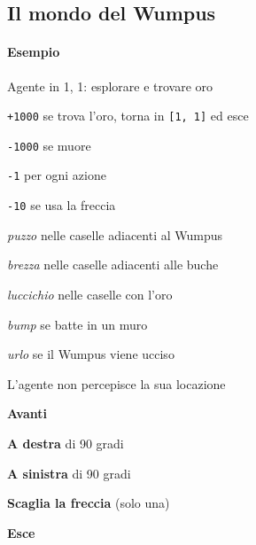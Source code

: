 \documentclass[10pt]{book}
\begin{document}
\subsection{Il mondo del Wumpus}
\paragraph{Esempio} Agente in 1, 1: esplorare e trovare oro
\begin{multicols}{2}
\begin{list}{}{\textbf{Misura delle prestazioni}}
	\item \texttt{+1000} se trova l'oro, torna in \texttt{[1, 1]} ed esce
	\item \texttt{-1000} se muore
	\item \texttt{-1} per ogni azione
	\item \texttt{-10} se usa la freccia
\end{list}
\begin{list}{}{\textbf{Percezioni}}
	\item \textit{puzzo} nelle caselle adiacenti al Wumpus
	\item \textit{brezza} nelle caselle adiacenti alle buche
	\item \textit{luccichio} nelle caselle con l'oro
	\item \textit{bump} se batte in un muro
	\item \textit{urlo} se il Wumpus viene ucciso
	\item L'agente non percepisce la sua locazione
\end{list}
\begin{list}{}{\textbf{Azioni}}
	\item \textbf{Avanti}
	\item \textbf{A destra} di 90 gradi
	\item \textbf{A sinistra} di 90 gradi
	\item \textbf{Scaglia la freccia} (solo una)
	\item \textbf{Esce}
\end{list}
\columnbreak


\end{multicols}
\end{document}
